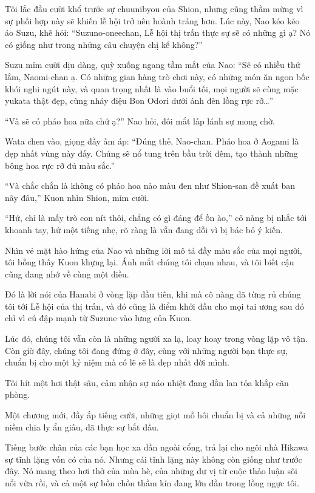 \documentclass[../main.tex]{subfiles}
\begin{document}
Tôi lắc đầu cười khổ trước sự chuunibyou của Shion, nhưng cũng thầm mừng vì sự phối hợp này sẽ khiến lễ hội trở nên hoành tráng hơn. Lúc này, Nao kéo kéo áo Suzu, khẽ hỏi: ``Suzuno-oneechan, Lễ hội thị trấn thực sự sẽ có những gì ạ? Nó có giống như trong những câu chuyện chị kể không?''

Suzu mỉm cười dịu dàng, quỳ xuống ngang tầm mắt của Nao: ``Sẽ có nhiều thứ lắm, Naomi-chan ạ. Có những gian hàng trò chơi này, có những món ăn ngon bốc khói nghi ngút này, và quan trọng nhất là vào buổi tối, mọi người sẽ cùng mặc yukata thật đẹp, cùng nhảy điệu Bon Odori dưới ánh đèn lồng rực rỡ\dots''

``Và sẽ có pháo hoa nữa chứ ạ?'' Nao hỏi, đôi mắt lấp lánh sự mong chờ.

Wata chen vào, giọng đầy ấm áp: ``Đúng thế, Nao-chan. Pháo hoa ở Aogami là đẹp nhất vùng này đấy. Chúng sẽ nổ tung trên bầu trời đêm, tạo thành những bông hoa rực rỡ đủ màu sắc.''

``Và chắc chắn là không có pháo hoa nào màu đen như Shion-san đề xuất ban nãy đâu,'' Kuon nhìn Shion, mỉm cười.

``Hứ, chỉ là mấy trò con nít thôi, chẳng có gì đáng để ồn ào,'' cô nàng bị nhắc tới khoanh tay, hứ một tiếng nhẹ, rõ ràng là vẫn đang dỗi vì bị bác bỏ ý kiến.

Nhìn vẻ mặt hào hứng của Nao và những lời mô tả đầy màu sắc của mọi người, tôi bỗng thấy Kuon khựng lại. Ánh mắt chúng tôi chạm nhau, và tôi biết cậu cũng đang nhớ về cùng một điều.

Đó là lời nói của Hanabi ở vòng lặp đầu tiên, khi mà cô nàng đã từng rủ chúng tôi tới Lễ hội của thị trấn, và đó cũng là điểm khởi đầu cho mọi tai ương sau đó chỉ vì cú đập mạnh từ Suzune vào lưng của Kuon.

Lúc đó, chúng tôi vẫn còn là những người xa lạ, loay hoay trong vòng lặp vô tận. Còn giờ đây, chúng tôi đang đứng ở đây, cùng với những người bạn thực sự, chuẩn bị cho một kỷ niệm mà có lẽ sẽ là đẹp nhất đời mình.

Tôi hít một hơi thật sâu, cảm nhận sự náo nhiệt đang dần lan tỏa khắp căn phòng.

Một chương mới, đầy ắp tiếng cười, những giọt mồ hôi chuẩn bị và cả những nỗi niềm chia ly ẩn giấu, đã thực sự bắt đầu.


Tiếng bước chân của các bạn học xa dần ngoài cổng, trả lại cho ngôi nhà Hikawa sự tĩnh lặng vốn có của nó. Nhưng cái tĩnh lặng này không còn giống như trước đây. Nó mang theo hơi thở của mùa hè, của những dư vị từ cuộc thảo luận sôi nổi vừa rồi, và cả một sự bồn chồn thầm kín đang lớn dần trong lồng ngực tôi.
\end{document}
